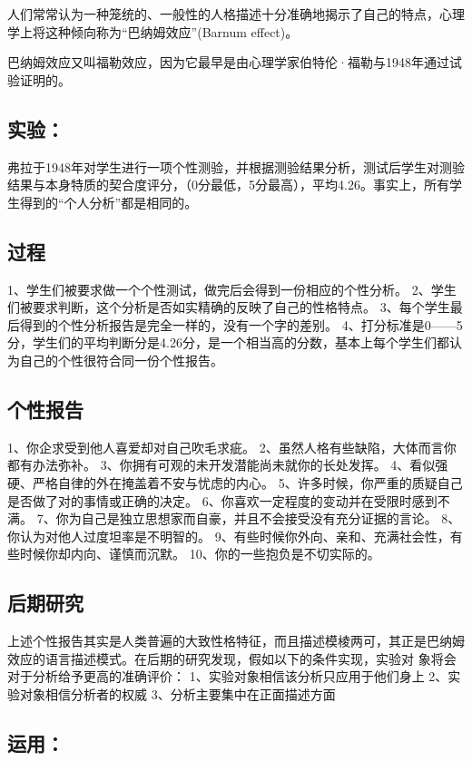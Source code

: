 \documentclass[11pt]{ctexart}
\begin{document}
人们常常认为一种笼统的、一般性的人格描述十分准确地揭示了自己的特点，心理学上将这种倾向称为“巴纳姆效应”(Barnum effect)。

巴纳姆效应又叫福勒效应，因为它最早是由心理学家伯特伦·福勒与1948年通过试验证明的。
\subsection{实验：}
\label{sec-6-1}


弗拉于1948年对学生进行一项个性测验，并根据测验结果分析，测试后学生对测验结果与本身特质的契合度评分，（0分最低，5分最高），平均4.26。事实上，所有学生得到的“个人分析”都是相同的。
\subsection{过程}
\label{sec-6-2}

1、学生们被要求做一个个性测试，做完后会得到一份相应的个性分析。
2、学生们被要求判断，这个分析是否如实精确的反映了自己的性格特点。
3、每个学生最后得到的个性分析报告是完全一样的，没有一个字的差别。
4、打分标准是0——5分，学生们的平均判断分是4.26分，是一个相当高的分数，基本上每个学生们都认为自己的个性很符合同一份个性报告。
\subsection{个性报告}
\label{sec-6-3}

1、你企求受到他人喜爱却对自己吹毛求疵。
2、虽然人格有些缺陷，大体而言你都有办法弥补。
3、你拥有可观的未开发潜能尚未就你的长处发挥。
4、看似强硬、严格自律的外在掩盖着不安与忧虑的内心。
5、许多时候，你严重的质疑自己是否做了对的事情或正确的决定。
6、你喜欢一定程度的变动并在受限时感到不满。
7、你为自己是独立思想家而自豪，并且不会接受没有充分证据的言论。
8、你认为对他人过度坦率是不明智的。
9、有些时候你外向、亲和、充满社会性，有些时候你却内向、谨慎而沉默。
10、你的一些抱负是不切实际的。
\subsection{后期研究}
\label{sec-6-4}

上述个性报告其实是人类普遍的大致性格特征，而且描述模棱两可，其正是巴纳姆效应的语言描述模式。在后期的研究发现，假如以下的条件实现，实验对
象将会对于分析给予更高的准确评价：
1、实验对象相信该分析只应用于他们身上
2、实验对象相信分析者的权威
3、分析主要集中在正面描述方面
\subsection{运用：}
\label{sec-6-5}
\end{document}
